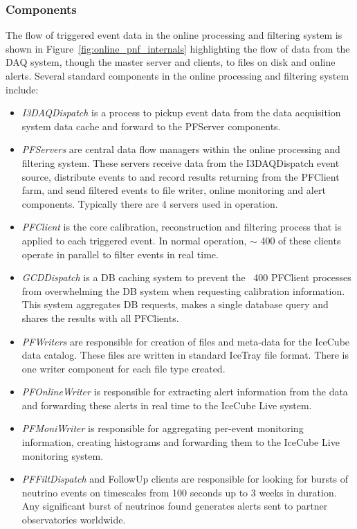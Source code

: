\subsubsection{Components}
The flow of triggered event data in the online processing and filtering system is shown in Figure~\ref{fig:online_pnf_internals}
highlighting the flow of data from the DAQ system, though the master server and clients, to files on disk and
online alerts.  Several standard components in the online processing and filtering system include:
\begin{itemize}
\item \emph {I3DAQDispatch} is a process to pickup event data from the data acquisition system data cache and forward to
the PFServer components.
\item \emph {PFServers} are central data flow managers within the  online processing and filtering system.  These servers 
receive data from the I3DAQDispatch event source, distribute events to and record results returning from the PFClient farm,
and send filtered events to file writer, online monitoring and alert components.  Typically there are 4 servers used
in operation.
\item \emph {PFClient} is the core calibration, reconstruction and filtering process that is applied to each triggered event.  
In normal operation, $\sim$ 400 of these clients operate in parallel to filter events in real time.
\item \emph {GCDDispatch} is a DB caching system to prevent the ~400 PFClient processes from overwhelming the 
DB system when requesting calibration information.  This system aggregates DB requests, makes a single
database query and shares the results with all PFClients.
\item \emph {PFWriters} are responsible for creation of files and meta-data for the IceCube data catalog.  These
files are written in standard IceTray file format.  There is one writer component for each file type created.
\item \emph {PFOnlineWriter} is responsible for extracting alert information from the data and forwarding these
alerts in real time to the IceCube Live system.
\item \emph {PFMoniWriter} is responsible for aggregating per-event monitoring information, creating histograms
and forwarding them to the IceCube Live monitoring system.  
\item \emph {PFFiltDispatch} and FollowUp clients are responsible for looking for bursts of neutrino events on timescales from 100 seconds up to
3 weeks in duration.  Any significant burst of neutrinos found generates alerts sent to partner observatories worldwide.
\end{itemize}

